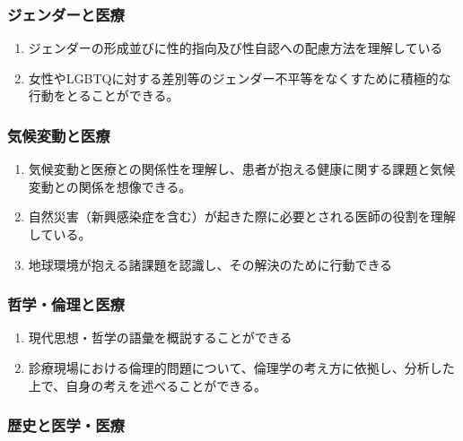 \hypertarget{ux30b8ux30a7ux30f3ux30c0ux30fcux3068ux533bux7642}{%
\subsubsection{ジェンダーと医療}\label{ux30b8ux30a7ux30f3ux30c0ux30fcux3068ux533bux7642}}

\begin{enumerate}
\def\labelenumi{\arabic{enumi}.}
\tightlist
\item
  ジェンダーの形成並びに性的指向及び性自認への配慮方法を理解している
\item
  女性やLGBTQに対する差別等のジェンダー不平等をなくすために積極的な行動をとることができる。
\end{enumerate}

\hypertarget{ux6c17ux5019ux5909ux52d5ux3068ux533bux7642}{%
\subsubsection{気候変動と医療}\label{ux6c17ux5019ux5909ux52d5ux3068ux533bux7642}}

\begin{enumerate}
\def\labelenumi{\arabic{enumi}.}
\tightlist
\item
  気候変動と医療との関係性を理解し、患者が抱える健康に関する課題と気候変動との関係を想像できる。
\item
  自然災害（新興感染症を含む）が起きた際に必要とされる医師の役割を理解している。
\item
  地球環境が抱える諸課題を認識し、その解決のために行動できる
\end{enumerate}

\hypertarget{ux54f2ux5b66ux502bux7406ux3068ux533bux7642}{%
\subsubsection{哲学・倫理と医療}\label{ux54f2ux5b66ux502bux7406ux3068ux533bux7642}}

\begin{enumerate}
\def\labelenumi{\arabic{enumi}.}
\tightlist
\item
  現代思想・哲学の語彙を概説することができる
\item
  診療現場における倫理的問題について、倫理学の考え方に依拠し、分析した上で、自身の考えを述べることができる。
\end{enumerate}

\hypertarget{ux6b74ux53f2ux3068ux533bux5b66ux533bux7642}{%
\subsubsection{歴史と医学・医療}\label{ux6b74ux53f2ux3068ux533bux5b66ux533bux7642}}

